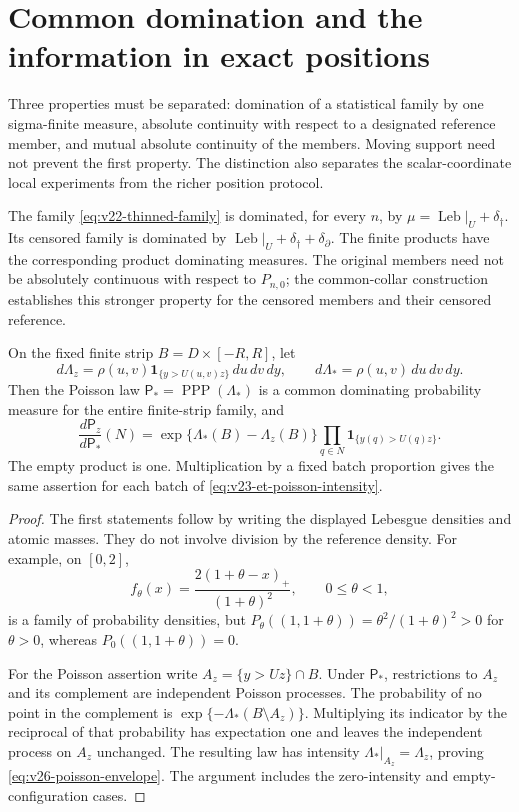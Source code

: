 \section{Common domination and the information in exact positions}
\label{sec:v26-domination}

Three properties must be separated: domination of a statistical family by
one sigma-finite measure, absolute continuity with respect to a designated
reference member, and mutual absolute continuity of the members.  Moving
support need not prevent the first property.  The distinction also separates
the scalar-coordinate local experiments from the richer position protocol.

\begin{proposition}
\label{prop:v26-common-domination}
The family \eqref{eq:v22-thinned-family} is dominated, for every \(n\), by
\(\mu=\operatorname{Leb}|_U+\delta_\dagger\).  Its censored family is
dominated by \(\operatorname{Leb}|_U+\delta_\dagger+\delta_\partial\).
The finite products have the corresponding product dominating measures.
The original members need not be absolutely continuous with respect to
\(P_{n,0}\); the common-collar construction establishes this stronger
property for the censored members and their censored reference.

On the fixed finite strip \(B=D\times[-R,R]\), let
\[
 d\Lambda_z=\rho(u,v)\mathbf1_{\{y>U(u,v)z\}}\,du\,dv\,dy,
 \qquad d\Lambda_* =\rho(u,v)\,du\,dv\,dy.
\]
Then the Poisson law \(\mathsf P_* =\operatorname{PPP}(\Lambda_*)\) is a
common dominating probability measure for the entire finite-strip family,
and
\begin{equation}\label{eq:v26-poisson-envelope}
 \frac{d\mathsf P_z}{d\mathsf P_*}(N)
 =\exp\{\Lambda_*(B)-\Lambda_z(B)\}
           \prod_{q\in N}\mathbf1_{\{y(q)>U(q)z\}}.
\end{equation}
The empty product is one.  Multiplication by a fixed batch proportion gives
the same assertion for each batch of \eqref{eq:v23-et-poisson-intensity}.
\end{proposition}

\begin{proof}
The first statements follow by writing the displayed Lebesgue densities
and atomic masses.  They do not involve division by the reference density.
For example, on \([0,2]\),
\[
 f_\theta(x)=\frac{2(1+\theta-x)_+}{(1+\theta)^2},\qquad 0\le\theta<1,
\]
is a family of probability densities, but
\(P_\theta((1,1+\theta))=\theta^2/(1+\theta)^2>0\) for \(\theta>0\),
whereas \(P_0((1,1+\theta))=0\).

For the Poisson assertion write \(A_z=\{y>Uz\}\cap B\).  Under
\(\mathsf P_*\), restrictions to \(A_z\) and its complement are
independent Poisson processes.  The probability of no point in the
complement is \(\exp\{-\Lambda_*(B\setminus A_z)\}\).  Multiplying its
indicator by the reciprocal of that probability has expectation one and
leaves the independent process on \(A_z\) unchanged.  The resulting law
has intensity \(\Lambda_*|_{A_z}=\Lambda_z\), proving
\eqref{eq:v26-poisson-envelope}.  The argument includes the zero-intensity
and empty-configuration cases.
\end{proof}

